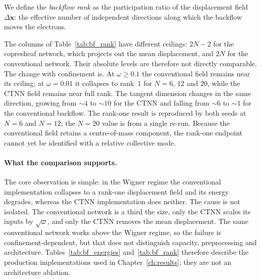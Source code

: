 We define the \emph{backflow rank} as the participation ratio of the displacement field
$\Delta\mathbf{x}$: the effective number of independent directions along which the backflow
moves the electrons.

The columns of Table~\ref{tab:bf_rank} have different ceilings: $2N-2$ for the copresheaf
network, which projects out the mean displacement, and $2N$ for the conventional network.
Their absolute levels are therefore not directly comparable. The change with confinement is.
At $\omega\ge0.1$ the conventional field remains near its ceiling; at $\omega=0.01$ it
collapses to rank~$1$ for $N=6$, $12$ and $20$, while the CTNN field remains near full rank.
The tangent dimension changes in the same direction, growing from ${\sim}4$ to ${\sim}10$
for the CTNN and falling from ${\sim}6$ to ${\sim}1$ for the conventional backflow. The
rank-one result is reproduced by both seeds at $N=6$ and $N=12$; the $N=20$ value is from a
single re-run. Because the conventional field retains a centre-of-mass component, the
rank-one endpoint cannot yet be identified with a relative collective mode.

\paragraph{What the comparison supports.} The core observation is simple: in the Wigner
regime the conventional implementation collapses to a rank-one displacement field and its
energy degrades, whereas the CTNN implementation does neither. The cause is not isolated.
The conventional network is a third the size, only the CTNN scales its inputs by
$\sqrt{\omega}$, and only the CTNN removes the mean displacement. The same conventional
network works above the Wigner regime, so the failure is confinement-dependent, but that
does not distinguish capacity, preprocessing and architecture.
Tables~\ref{tab:bf_energies} and~\ref{tab:bf_rank} therefore describe the production
implementations used in Chapter~\ref{ch:results}; they are not an architecture ablation.


